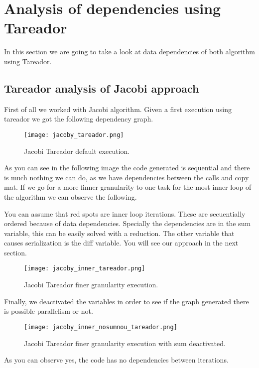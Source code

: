 \section{Analysis of dependencies using Tareador}
\justify
In this section we are going to take a look at data dependencies of both algorithm using Tareador.
\subsection{Tareador analysis of Jacobi approach}
\justify
First of all we worked with Jacobi algorithm. Given a first execution using tareador we got the following dependency graph.

\begin{figure}[h!]
    \centering
    \texttt{[image: jacoby\_tareador.png]}
    \caption{Jacobi Tareador default execution.}
    \label{fig:jacobitar}
\end{figure}

\justify
As you can see in the following image the code generated is sequential and there is much nothing we can do, as we have dependencies between the calls and copy mat. If we go for a more finner granularity to one task for the most inner loop of the algorithm we can observe the following.

\justify
You can assume that red spots are inner loop iterations. These are secuentially ordered because of data dependencies. Specially the dependencies are in the sum variable, this can be easily solved with a reduction. The other variable that causes serialization is the diff variable. You will see our approach in the next section. 

\begin{figure}[H]
    \centering
    \texttt{[image: jacoby\_inner\_tareador.png]}
    \caption{Jacobi Tareador finer granularity execution.}
    \label{fig:jacobinnertar}
\end{figure}

\justify
Finally, we deactivated the variables in order to see if the graph generated there is possible parallelism or not.

\begin{figure}[H]
    \centering
    \texttt{[image: jacoby\_inner\_nosumnou\_tareador.png]}
    \caption{Jacobi Tareador finer granularity execution with sum deactivated.}
    \label{fig:jacobinnertarnosum}
\end{figure}
\justify
As you can observe yes, the code has no dependencies between iterations. 

